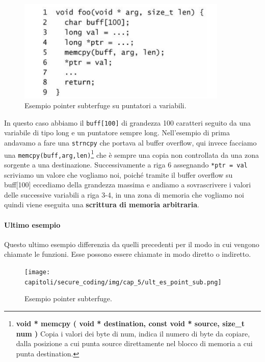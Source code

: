 \vspace{-1em}

\begin{figure}[H]
	\centering
	\includegraphics[width=10cm, keepaspectratio]{capitoli/secure_coding/img/cap_5/es_pointer_var.png}
	\caption{Esempio pointer subterfuge su puntatori a variabili.}\label{fig:es_poin_var}
\end{figure}

\vspace{-0.5em}

In questo caso abbiamo il \verb|buff[100]| di grandezza 100 caratteri seguito da
una variabile di tipo long e un puntatore sempre long. Nell'esempio di prima andavamo a
fare una \verb|strncpy| che portava al buffer overflow, qui invece facciamo
una \verb|memcpy(buff,arg,len)|\footnote{\textbf{void * memcpy ( void * destination,
		const void * source, size\_t num )}  Copia i valori dei byte di num, indica il numero di
	byte da copiare, dalla posizione a cui punta source direttamente nel blocco di memoria
	a cui punta destination.} che è sempre una copia non controllata da una zona sorgente
a una destinazione. Successivamente a riga 6 assegnando \verb|*ptr = val| scriviamo
un valore che vogliamo noi, poiché tramite il buffer overflow su buff[100] eccediamo
della grandezza massima e andiamo a sovrascrivere i valori delle successive variabili
a riga 3-4, in una zona di memoria che vogliamo noi quindi viene eseguita
una \textbf{scrittura di memoria arbitraria}.

\paragraph{Ultimo esempio}
Questo ultimo esempio differenzia da quelli precedenti per il modo in cui vengono
chiamate le funzioni. Esse possono essere chiamate in modo diretto o indiretto.

\begin{figure}[H]
	\centering
	\texttt{[image: capitoli/secure\_coding/img/cap\_5/ult\_es\_point\_sub.png]}
	\caption{Esempio pointer subterfuge.}\label{fig:ult_es_poin}
\end{figure}


